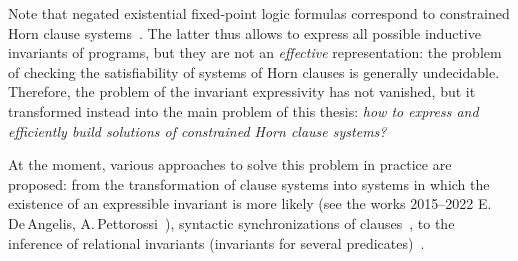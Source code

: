 Note that negated existential fixed-point logic formulas correspond to constrained Horn clause systems~\cite{Bjorner2015}.
The latter thus allows to express all possible inductive invariants of programs, but they are not an \emph{effective} representation: the problem of checking the satisfiability of systems of Horn clauses is generally undecidable.
Therefore, the problem of the invariant expressivity has not vanished, but it transformed instead into the main problem of this thesis:
\emph{how to express and efficiently build solutions of constrained Horn clause systems?}


At the moment, various approaches to solve this problem in practice are proposed: from the transformation of clause systems into systems in which the existence of an expressible invariant is more likely (see the works \numrange{2015}{2022} E.\,De\,Angelis,  A.\,Pettorossi~\cite{angelis_fioravanti_pettorossi_proietti_2015,10.1007/978-3-662-53413-7_8,10.1093/logcom/exab090,pettorossi_proietti_2022,10.1007/978-3-030-51074-9_6,angelis_fioravanti_pettorossi_proietti_2018}), syntactic synchronizations of clauses~\cite{10.1007/978-3-662-53413-7_8,LPAR-21:Synchronizing_Constrained_Horn_Clauses}, to the inference of relational invariants (invariants for several predicates)~\cite{mordvinov2020,DBLP:journals/corr/abs-2304-12588}.


